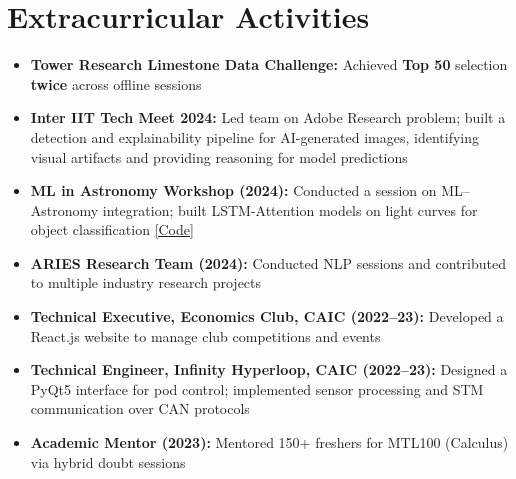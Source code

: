 \documentclass[10pt,letterpaper]{article}
\newcommand{\lnk}[2]{\href{#1}{\color{linkblue}#2}}
\begin{document}
\section{Extracurricular Activities}
\begin{itemize}
  \item \textbf{Tower Research Limestone Data Challenge:} Achieved \textbf{Top 50} selection \textbf{twice} across offline sessions
  \item \textbf{Inter IIT Tech Meet 2024:} Led team on Adobe Research problem; built a detection and explainability pipeline for AI-generated images, identifying visual artifacts and providing reasoning for model predictions
  \item \textbf{ML in Astronomy Workshop (2024):} Conducted a session on ML--Astronomy integration; built LSTM-Attention models on light curves for object classification \lnk{https://github.com/8have5h/ml_astro_pac}{[Code]}
  \item \textbf{ARIES Research Team (2024):} Conducted NLP sessions and contributed to multiple industry research projects
  \item \textbf{Technical Executive, Economics Club, CAIC (2022--23):} Developed a React.js website to manage club competitions and events
  \item \textbf{Technical Engineer, Infinity Hyperloop, CAIC (2022--23):} Designed a PyQt5 interface for pod control; implemented sensor processing and STM communication over CAN protocols
  \item \textbf{Academic Mentor (2023):} Mentored 150+ freshers for MTL100 (Calculus) via hybrid doubt sessions
\end{itemize}
\end{document}
